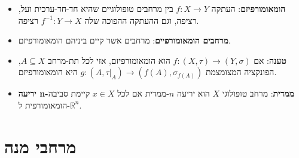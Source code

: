 \documentclass{tstextbook}
\begin{document}
\begin{summary}
  \begin{itemize}
    \item \textbf{הומאומורפיזם}: העתקה \(f:X\to Y\) בין מרחבים טופולוגיים שהיא חד-חד-ערכית ועל, רציפה, וגם ההעתקה ההפוכה שלה \(f^{-1}:Y\to X\) רציפה.
    \item \textbf{מרחבים הומאומורפיים}: מרחבים אשר קיים ביניהם הומאומורפיזם.
    \item \textbf{טענה}: אם \(f:(X,\tau)\to (Y,\sigma)\) הוא הומאומורפיזם, אזי לכל תת-מרחב \(A\subseteq X\), הפונקציה המצומצמת \(g:(A,\tau|_{A})\to(f(A),\sigma_{f(A)})\) היא הומאומורפיזם.
    \item \textbf{יריעה n-ממדית}: מרחב טופולוגי \(X\) הוא יריעה \(n\)-ממדית אם לכל \(x\in X\) קיימת סביבה הומאומורפית ל-\(\mathbb{R}^n\).
  \end{itemize}
\end{summary}
\section{מרחבי מנה}
\end{document}
